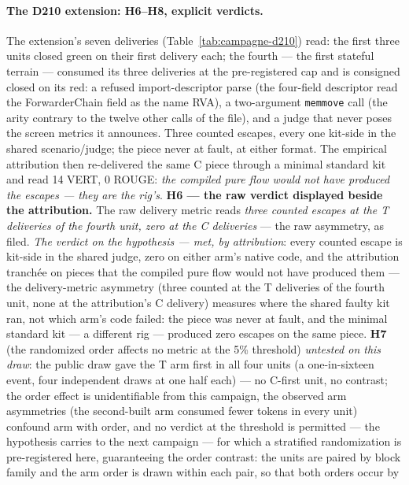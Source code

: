 \documentclass[11pt,a4paper]{article}
\newcommand{\code}[1]{\texttt{\small #1}}
\begin{document}
\paragraph{The D210 extension: H6--H8, explicit verdicts.} The
extension's seven deliveries (Table~\ref{tab:campagne-d210}) read:
the first three units closed green on their first delivery each; the
fourth --- the first stateful terrain --- consumed its three
deliveries at the pre-registered cap and is consigned closed on its
red: a refused import-descriptor parse (the four-field descriptor
read the ForwarderChain field as the name RVA), a two-argument
\code{memmove} call (the arity contrary to the twelve other calls of
the file), and a judge that never poses the screen metrics it
announces. Three counted escapes, every one kit-side in the shared
scenario/judge; the piece never at fault, at either format. The
empirical attribution then re-delivered the same C piece through a
minimal standard kit and read 14 VERT, 0 ROUGE: \emph{the compiled
pure flow would not have produced the escapes --- they are the
rig's}. \textbf{H6 --- the raw verdict displayed beside the attribution.}
The raw delivery metric reads \emph{three counted escapes at the T
deliveries of the fourth unit, zero at the C deliveries} --- the raw
asymmetry, as filed. \emph{The verdict on the hypothesis --- met,
by attribution}:
every counted escape is kit-side in the shared judge, zero on either
arm's native code, and the attribution tranch\'ee on pieces that the
compiled pure flow would not have produced them --- the
delivery-metric asymmetry (three counted at the T deliveries of the
fourth unit, none at the attribution's C delivery) measures where the
shared faulty kit ran, not which arm's code failed: the piece was
never at fault, and the minimal standard kit --- a different rig ---
produced zero escapes on the same piece. \textbf{H7} (the randomized
order affects no metric at the 5\% threshold) \emph{untested on this
draw}: the public draw gave the T arm first in all four units (a
one-in-sixteen event, four independent draws at one half each) --- no
C-first unit, no contrast; the order effect is unidentifiable from
this campaign, the observed arm asymmetries (the second-built arm
consumed fewer tokens in every unit) confound arm with order, and no
verdict at the threshold is permitted --- the hypothesis carries to the next campaign --- for which a
stratified randomization is pre-registered here, guaranteeing the
order contrast: the units are paired by block family and the arm
order is drawn within each pair, so that both orders occur by
\end{document}
